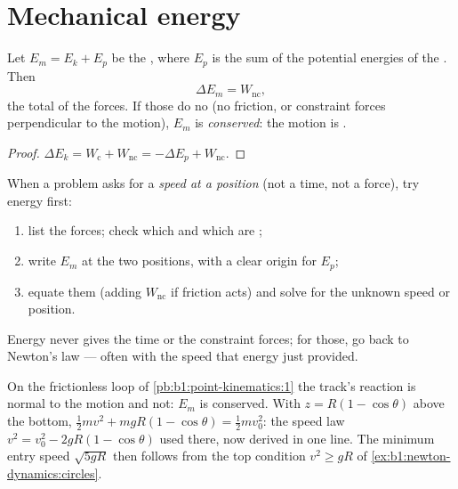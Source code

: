 \section{Mechanical energy}

\begin{theorem}\label{thm:b1:work-and-energy:em}
Let $E_m = E_k + E_p$ be the \emph{}, where $E_p$ is the
sum of the potential energies of the . Then
\[
\Delta E_m = W_{\text{nc}} ,
\]
the total  of the  forces. If those do no 
(no friction, or constraint forces perpendicular to the motion), $E_m$
is \emph{conserved}: the motion is \emph{}.
\end{theorem}

\begin{proof}
$\Delta E_k = W_{\text{c}} + W_{\text{nc}} = -\Delta E_p + W_{\text{nc}}$.
\end{proof}

\begin{method}\label{met:b1:work-and-energy:method}
When a problem asks for a \emph{speed at a position} (not a time, not a
force), try energy first:
\begin{enumerate}
  \item list the forces; check which  and which are ;
  \item write $E_m$ at the two positions, with a clear origin for $E_p$;
  \item equate them (adding $W_{\text{nc}}$ if friction acts) and solve
        for the unknown speed or position.
\end{enumerate}
Energy never gives the time or the constraint forces; for those, go
back to Newton's law --- often with the speed that energy just provided.
\end{method}

\begin{example}\label{ex:b1:work-and-energy:loop}
On the frictionless loop of \cref{pb:b1:point-kinematics:1} the track's
reaction is normal to the motion and  not: $E_m$ is conserved.
With $z = R(1 - \cos\theta)$ above the bottom, $\tfrac12 mv^2 + mgR(1 -
\cos\theta) = \tfrac12 mv_0^2$: the speed law $v^2 = v_0^2 - 2gR(1 -
\cos\theta)$ used there, now derived in one line. The minimum entry
speed $\sqrt{5gR}$ then follows from the top condition
$v^2 \geq gR$ of \cref{ex:b1:newton-dynamics:circles}.
\end{example}


